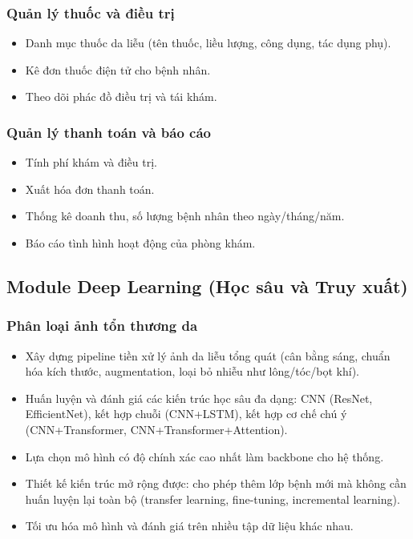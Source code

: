 \documentclass[12pt,a4paper]{article}
\begin{document}
\subsubsection{Quản lý thuốc và điều trị}
\begin{itemize}
    \item Danh mục thuốc da liễu (tên thuốc, liều lượng, công dụng, tác dụng phụ).
    \item Kê đơn thuốc điện tử cho bệnh nhân.
    \item Theo dõi phác đồ điều trị và tái khám.
\end{itemize}

\subsubsection{Quản lý thanh toán và báo cáo}
\begin{itemize}
    \item Tính phí khám và điều trị.
    \item Xuất hóa đơn thanh toán.
    \item Thống kê doanh thu, số lượng bệnh nhân theo ngày/tháng/năm.
    \item Báo cáo tình hình hoạt động của phòng khám.
\end{itemize}

\subsection{Module Deep Learning (Học sâu và Truy xuất)}

\subsubsection{Phân loại ảnh tổn thương da}
\begin{itemize}
    \item Xây dựng pipeline tiền xử lý ảnh da liễu tổng quát (cân bằng sáng, chuẩn hóa kích thước, augmentation, loại bỏ nhiễu như lông/tóc/bọt khí).
    \item Huấn luyện và đánh giá các kiến trúc học sâu đa dạng: CNN (ResNet, EfficientNet), kết hợp chuỗi (CNN+LSTM), kết hợp cơ chế chú ý (CNN+Transformer, CNN+Transformer+Attention).
    \item Lựa chọn mô hình có độ chính xác cao nhất làm backbone cho hệ thống.
    \item Thiết kế kiến trúc mở rộng được: cho phép thêm lớp bệnh mới mà không cần huấn luyện lại toàn bộ (transfer learning, fine-tuning, incremental learning).
    \item Tối ưu hóa mô hình và đánh giá trên nhiều tập dữ liệu khác nhau.
\end{itemize}
\end{document}
